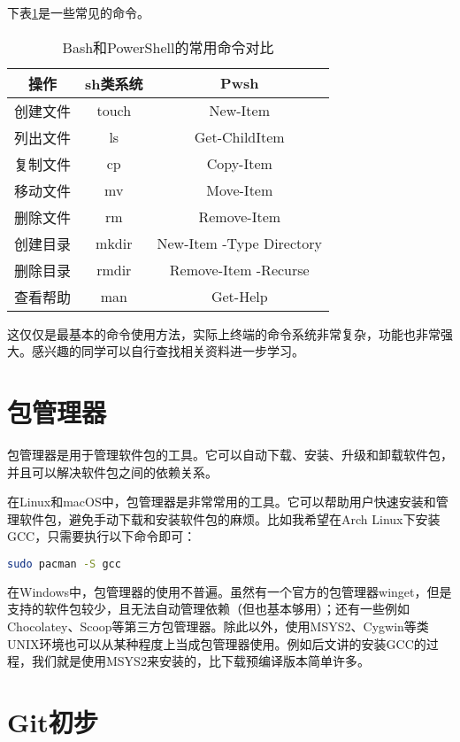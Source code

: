 \documentclass[../main.tex]{subfiles}
\begin{document}
下表\ref{tab:terminal-commands}是一些常见的命令。

\begin{table}[htbp]
  \centering
  \begin{tabular}{c|cc}
    \hline
    \textbf{操作} & \textbf{\*sh类系统} & \textbf{Pwsh} \\
    \hline
    创建文件 & touch & New-Item \\
    列出文件 & ls & Get-ChildItem \\
    复制文件 & cp & Copy-Item \\
    移动文件 & mv & Move-Item \\
    删除文件 & rm & Remove-Item \\
    创建目录 & mkdir & New-Item -Type Directory \\
    删除目录 & rmdir & Remove-Item -Recurse \\
    查看帮助 & man & Get-Help \\
    \hline
  \end{tabular}
  \caption{Bash和PowerShell的常用命令对比}
  \label{tab:terminal-commands}
\end{table}

这仅仅是最基本的命令使用方法，实际上终端的命令系统非常复杂，功能也非常强大。感兴趣的同学可以自行查找相关资料进一步学习。

\section{包管理器}

包管理器是用于管理软件包的工具。它可以自动下载、安装、升级和卸载软件包，并且可以解决软件包之间的依赖关系。

在Linux和macOS中，包管理器是非常常用的工具。它可以帮助用户快速安装和管理软件包，避免手动下载和安装软件包的麻烦。比如我希望在Arch Linux下安装GCC，只需要执行以下命令即可：

\begin{lstlisting}[language=bash]
    sudo pacman -S gcc
\end{lstlisting}

在Windows中，包管理器的使用不普遍。虽然有一个官方的包管理器winget，但是支持的软件包较少，且无法自动管理依赖（但也基本够用）；还有一些例如Chocolatey、Scoop等第三方包管理器。除此以外，使用MSYS2、Cygwin等类UNIX环境也可以从某种程度上当成包管理器使用。例如后文讲的安装GCC的过程，我们就是使用MSYS2来安装的，比下载预编译版本简单许多。

\section{Git初步}\label{sec:git}
\end{document}
